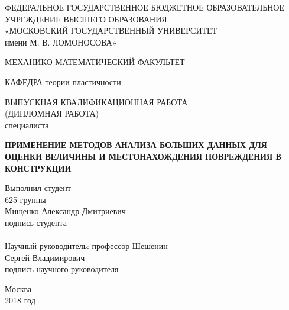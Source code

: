 \documentclass[a4paper,12pt]{article}
\theoremstyle{remark}
\begin{document}
	
	\begin{titlepage}
		\begin{center}
			\large
			ФЕДЕРАЛЬНОЕ ГОСУДАРСТВЕННОЕ БЮДЖЕТНОЕ ОБРАЗОВАТЕЛЬНОЕ\\УЧРЕЖДЕНИЕ ВЫСШЕГО ОБРАЗОВАНИЯ\\«МОСКОВСКИЙ ГОСУДАРСТВЕННЫЙ УНИВЕРСИТЕТ\\имени М. В. ЛОМОНОСОВА»
			
			\vspace{0.8 cm}
			МЕХАНИКО-МАТЕМАТИЧЕСКИЙ ФАКУЛЬТЕТ
			
			\vspace{0.8 cm}
			КАФЕДРА теории пластичности
			
			\vspace{2.4 cm}
			ВЫПУСКНАЯ КВАЛИФИКАЦИОННАЯ РАБОТА\\(ДИПЛОМНАЯ РАБОТА)\\специалиста
			
			\vspace{0.8 cm}
			\textbf{ПРИМЕНЕНИЕ МЕТОДОВ АНАЛИЗА БОЛЬШИХ ДАННЫХ ДЛЯ ОЦЕНКИ ВЕЛИЧИНЫ И МЕСТОНАХОЖДЕНИЯ ПОВРЕЖДЕНИЯ В КОНСТРУКЦИИ}
		\end{center}
	
		\vspace{1.6 cm}
		\begin{adjustwidth}{10 cm}{0 cm}
			Выполнил студент\\625 группы\\Мищенко Александр Дмитриевич
			\vspace{1.6 cm}
			\newline
			\underline{ \hspace{6.4 cm}}\\
			подпись студента\\\\
			Научный руководитель:
			профессор Шешенин\\Сергей Владимирович
			\vspace{0.4 cm}
			\newline
			\underline{ \hspace{6.4 cm}}\\
			подпись научного руководителя
		\end{adjustwidth}

		\vspace*{\fill}
		\begin{center}
			Москва\\2018 год
		\end{center}
	\end{titlepage}
\end{document}
